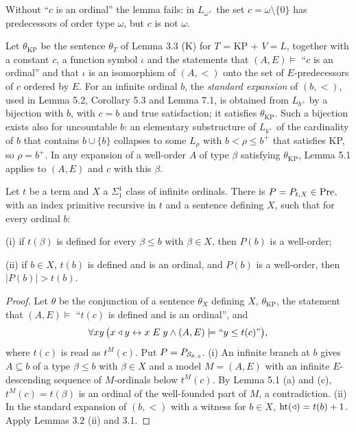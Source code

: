 \documentclass[11pt]{article}
\begin{document}
Without ``$c$ is an ordinal'' the lemma fails: in $L_{\omega^+}$ the set $c = \omega \setminus \{0\}$ has predecessors
of order type $\omega$, but $c$ is not $\omega$.

Let $\theta_{\mathrm{KP}}$ be the sentence $\theta_T$ of Lemma 3.3 (K) for $T$ = KP + $V = L$, together with a
constant $c$, a function symbol $\iota$ and the statements that $(A, E) \models$ ``$c$ is an ordinal'' and that
$\iota$ is an isomorphism of $(A, <)$ onto the set of $E$-predecessors of $c$ ordered by $E$. For an infinite
ordinal $b$, the \emph{standard expansion} of $(b, <)$, used in Lemma 5.2, Corollary 5.3 and Lemma 7.1, is obtained from $L_{b^+}$ by a bijection with $b$, with
$c = b$ and true satisfaction; it satisfies $\theta_{\mathrm{KP}}$. Such a bijection exists also for uncountable $b$:
an elementary substructure of $L_{b^+}$ of the cardinality of $b$ that contains $b \cup \{b\}$ collapses to some
$L_{\rho}$ with $b < \rho \le b^+$ that satisfies KP, so $\rho = b^+$. In any expansion of a well-order $A$ of type
$\beta$ satisfying $\theta_{\mathrm{KP}}$, Lemma 5.1 applies to $(A, E)$ and $c$ with this $\beta$.

\begin{statement} Let $t$ be a term and $X$ a $\Sigma^1_1$ class of infinite ordinals. There is
$P = P_{t, X} \in \mathrm{Pre}$, with an index primitive recursive in $t$ and a sentence defining $X$, such that for every
ordinal $b$:

(i) if $t(\beta)$ is defined for every $\beta \le b$ with $\beta \in X$, then $P(b)$ is a well-order;

(ii) if $b \in X$, $t(b)$ is defined and is an ordinal, and $P(b)$ is a well-order, then $|P(b)| > t(b)$.
\end{statement}

\begin{proof} Let $\theta$ be the conjunction of a sentence $\theta_X$ defining $X$, $\theta_{\mathrm{KP}}$, the
statement that $(A, E) \models$ ``$t(c)$ is defined and is an ordinal'', and
\[ \forall x y\, \bigl(x \triangleleft y \leftrightarrow x \mathrel{E} y \wedge (A, E) \models \text{``} y \le t(c) \text{''}\bigr), \]
where $t(c)$ is read as $t^M(c)$. Put $P = P_{\mathcal S_{\theta, \triangleleft}}$. (i) An infinite branch at $b$ gives
$A \subseteq b$ of a type $\beta \le b$ with $\beta \in X$ and a model $M = (A, E)$ with an infinite $E$-descending
sequence of $M$-ordinals below $t^M(c)$. By Lemma 5.1 (a) and (c), $t^M(c) = t(\beta)$ is an ordinal of the
well-founded part of $M$, a contradiction. (ii) In the standard expansion of $(b, <)$ with a witness for $b \in X$,
$\operatorname{ht}(\triangleleft) = t(b) + 1$. Apply Lemmas 3.2 (ii) and 3.1.
\end{proof}
\end{document}
